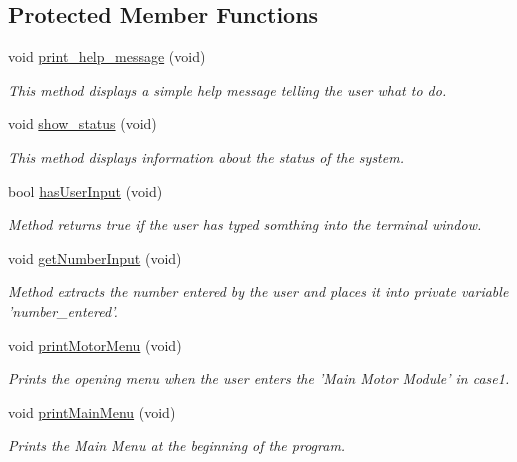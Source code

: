 \subsection*{Protected Member Functions}
\begin{DoxyCompactItemize}
\item 
void \hyperlink{classtask__user_a75475060f83bae1e44bcc8a5c34015c7}{print\-\_\-help\-\_\-message} (void)
\begin{DoxyCompactList}\small\item\em This method displays a simple help message telling the user what to do. \end{DoxyCompactList}\item 
void \hyperlink{classtask__user_a105bebbd9cb1031154c3dfc3662db4a0}{show\-\_\-status} (void)
\begin{DoxyCompactList}\small\item\em This method displays information about the status of the system. \end{DoxyCompactList}\item 
bool \hyperlink{classtask__user_aeebf78dc3a261ab26f137b9dedb4fae3}{has\-User\-Input} (void)
\begin{DoxyCompactList}\small\item\em Method returns true if the user has typed somthing into the terminal window. \end{DoxyCompactList}\item 
void \hyperlink{classtask__user_a6614555d84fb90fb2ae6c53a6e4ee7e6}{get\-Number\-Input} (void)
\begin{DoxyCompactList}\small\item\em Method extracts the number entered by the user and places it into private variable 'number\-\_\-entered'. \end{DoxyCompactList}\item 
void \hyperlink{classtask__user_a120498a0bdee78e47a42a1e6b8ee3ca9}{print\-Motor\-Menu} (void)
\begin{DoxyCompactList}\small\item\em Prints the opening menu when the user enters the 'Main Motor Module' in case1. \end{DoxyCompactList}\item 
void \hyperlink{classtask__user_ad7a5286a05c1782688037fd26c7e3d82}{print\-Main\-Menu} (void)
\begin{DoxyCompactList}\small\item\em Prints the Main Menu at the beginning of the program. \end{DoxyCompactList}\item 

\end{DoxyCompactItemize}
